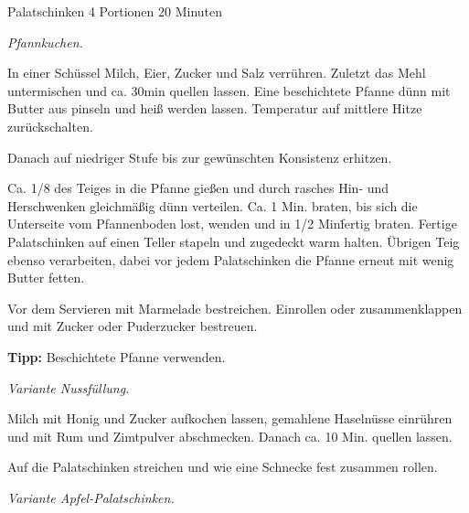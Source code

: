 \begin{recipe}{Palatschinken} {4 Portionen} {20 Minuten}

  \freeform
  \textit{Pfannkuchen.}


  In einer Schüssel Milch, Eier, Zucker und Salz verrühren.
  Zuletzt das Mehl untermischen und ca. 30min quellen lassen.
  Eine beschichtete Pfanne dünn mit Butter aus pinseln und heiß werden lassen.
  Temperatur auf mittlere Hitze zurückschalten.

  \newstep
  Danach auf niedriger Stufe bis zur gewünschten Konsistenz erhitzen.

  \newstep
  Ca. 1/8 des Teiges in die Pfanne gießen und durch rasches Hin- und Herschwenken gleichmäßig dünn verteilen.
  Ca. 1 Min. braten, bis sich die Unterseite vom Pfannenboden lost, wenden und in 1/2 Min\. fertig braten.
  Fertige Palatschinken auf einen Teller stapeln und zugedeckt warm halten.
  Übrigen Teig ebenso verarbeiten, dabei vor jedem Palatschinken die Pfanne erneut mit wenig Butter fetten.

  \newstep
  Vor dem Servieren mit Marmelade bestreichen.
  Einrollen oder zusammenklappen und mit Zucker oder Puderzucker bestreuen.

  \freeform
  \hrulefill

  \freeform
  \textbf{Tipp:}
  Beschichtete Pfanne verwenden.
  \newpage

  \freeform
  \textit{Variante Nussfüllung.}


  Milch mit Honig und Zucker aufkochen lassen, gemahlene Haselnüsse einrühren und mit Rum und Zimtpulver abschmecken.
  Danach ca. 10 Min. quellen lassen.

  \newstep
  Auf die Palatschinken streichen und wie eine Schnecke fest zusammen rollen.

  \freeform
  \hrulefill

  \freeform
  \textit{Variante Apfel-Palatschinken.}



\end{recipe}

